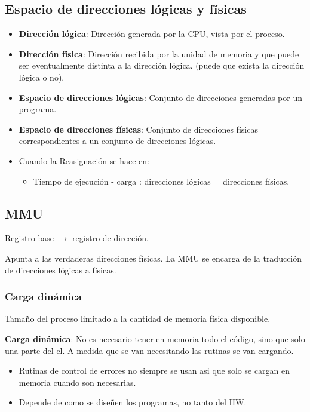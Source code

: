 \documentclass{templateNote}
\begin{document}
\subsection*{Espacio de direcciones lógicas y físicas}
\begin{itemize}
    \item \textbf{Dirección lógica}: Dirección generada por la CPU, vista por el proceso.
    \item \textbf{Dirección física}: Dirección recibida por la unidad de memoria y que puede ser eventualmente distinta a la dirección lógica. (puede que exista la dirección lógica o no).
    \item \textbf{Espacio de direcciones lógicas}: Conjunto de direcciones generadas por un programa.
    \item \textbf{Espacio de direcciones físicas}: Conjunto de direcciones físicas correspondientes a un conjunto de direcciones lógicas.
    \item Cuando la Reasignación se hace en:
    \begin{itemize}
        \item Tiempo de ejecución - carga : direcciones lógicas = direcciones físicas.
    \end{itemize}
\end{itemize}


\subsection*{MMU}

Registro base $\rightarrow$ registro de dirección.

Apunta a las verdaderas direcciones físicas. La MMU se encarga de la traducción de direcciones lógicas a físicas.


\subsubsection*{Carga dinámica}

Tamaño del proceso limitado a la cantidad de memoria física disponible. 

\textbf{Carga dinámica}: No es necesario tener en memoria todo el código, sino que solo una parte del el. A medida que se van necesitando las rutinas se van cargando.
\begin{itemize}
    \item Rutinas de control de errores no siempre se usan asi que solo se cargan en memoria cuando son necesarias. 
    \item Depende de como se diseñen los programas, no tanto del HW.
\end{itemize}
\end{document}
